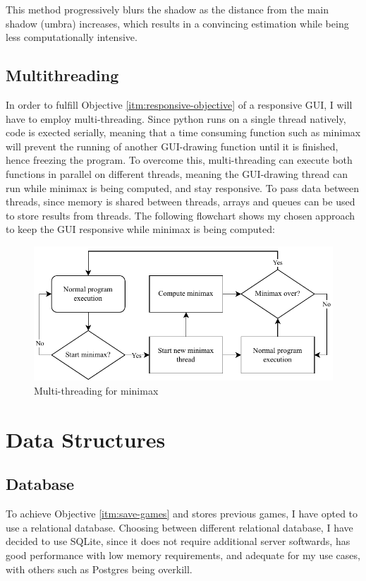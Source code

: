 \documentclass[../main/main.tex]{subfiles}
\begin{document}
This method progressively blurs the shadow as the distance from the main shadow (umbra) increases, which results in a convincing estimation while being less computationally intensive.

\subsection{Multithreading}
In order to fulfill Objective \ref{itm:responsive-objective} of a responsive GUI, I will have to employ multi-threading. Since python runs on a single thread natively, code is exected serially, meaning that a time consuming function such as minimax will prevent the running of another GUI-drawing function until it is finished, hence freezing the program. To overcome this, multi-threading can execute both functions in parallel on different threads, meaning the GUI-drawing thread can run while minimax is being computed, and stay responsive. To pass data between threads, since memory is shared between threads, arrays and queues can be used to store results from threads. The following flowchart shows my chosen approach to keep the GUI responsive while minimax is being computed:

\begin{figure}[H]
    \centering
    \includegraphics[width=\columnwidth]{../design/assets/multi_threading.pdf}
    \caption{Multi-threading for minimax}
    \label{fig:multi-threading}
\end{figure}

\section{Data Structures}
\subsection{Database}
To achieve Objective \ref{itm:save-games} and stores previous games, I have opted to use a relational database. Choosing between different relational database, I have decided to use SQLite, since it does not require additional server softwards, has good performance with low memory requirements, and adequate for my use cases, with others such as Postgres being overkill.
\end{document}
